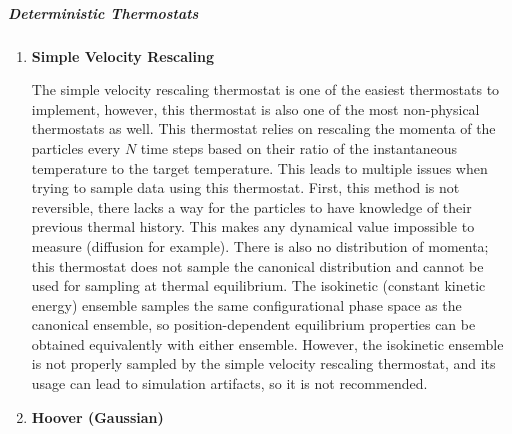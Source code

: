 \documentclass[9pt,bestpractices]{livecoms}
\begin{document}
\subparagraph{Deterministic Thermostats}
\begin{enumerate}[listparindent=\parindent]
    \item \textbf{Simple Velocity Rescaling}

        The simple velocity rescaling thermostat is one of the easiest thermostats to implement, however, this thermostat is also one of the most non-physical thermostats as well.
        This thermostat relies on rescaling the momenta of the particles every $N$ time steps based on their ratio of the instantaneous temperature to the target temperature\cite{thermostatAlgorithms2005}.
        This leads to multiple issues when trying to sample data using this thermostat.
        First, this method is not reversible, there lacks a way for the particles to have knowledge of their previous thermal history.
        This makes any dynamical value impossible to measure (diffusion for example).
        There is also no distribution of momenta; this thermostat does not sample the canonical distribution and cannot be used for sampling at thermal equilibrium.
        The isokinetic (constant kinetic energy) ensemble samples the same configurational phase space as the canonical ensemble, so position-dependent equilibrium properties can be obtained equivalently with either ensemble\cite{Minary:2003:JChemPhys:Algorithms}.
        However, the isokinetic ensemble is not properly sampled by the simple velocity rescaling thermostat, and its usage can lead to simulation artifacts, so it is not recommended\cite{2018Braun}.

    \item \textbf{Hoover (Gaussian)}
        

\end{enumerate}
\end{document}
